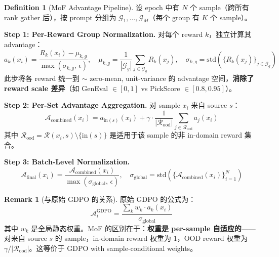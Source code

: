 \documentclass[11pt,a4paper]{article}
\theoremstyle{definition}
\newtheorem{definition}{Definition}
\newtheorem{remark}{Remark}
\begin{document}
\begin{definition}[MoF Advantage Pipeline]
\label{def:advantage}
设 epoch 中有 $N$ 个 sample（跨所有 rank gather 后），按 prompt 分组为 $\mathcal{G}_1, \ldots, \mathcal{G}_M$（每个 group 有 $K$ 个 sample）。

\textbf{Step 1: Per-Reward Group Normalization.} 对每个 reward $k$，独立计算其 advantage：
\begin{equation}
a_k(x_i) = \frac{R_k(x_i) - \mu_{k,g}}{\max(\sigma_{k,g},\, \epsilon)}, \quad
\mu_{k,g} = \frac{1}{|\mathcal{G}_g|}\sum_{j \in \mathcal{G}_g} R_k(x_j), \quad
\sigma_{k,g} = \mathrm{std}(\{R_k(x_j)\}_{j \in \mathcal{G}_g})
\label{eq:per_reward_norm}
\end{equation}
此步将各 reward 统一到 $\sim$ zero-mean, unit-variance 的 advantage 空间，\textbf{消除了 reward scale 差异}（如 GenEval $\in [0,1]$ vs PickScore $\in [0.8, 0.95]$）。

\textbf{Step 2: Per-Set Advantage Aggregation.} 对 sample $x_i$ 来自 source $s$：
\begin{equation}
\boxed{
\mathcal{A}_{\mathrm{combined}}(x_i) = a_{\mathrm{in}(s)}(x_i) + \gamma \cdot \frac{1}{|\mathcal{R}_{\mathrm{ood}}|}\sum_{j \in \mathcal{R}_{\mathrm{ood}}} a_j(x_i)
}
\label{eq:advantage_aggregation}
\end{equation}
其中 $\mathcal{R}_{\mathrm{ood}} = \mathcal{R}(x_i, s) \setminus \{\mathrm{in}(s)\}$ 是适用于该 sample 的非 in-domain reward 集合。

\textbf{Step 3: Batch-Level Normalization.}
\begin{equation}
\mathcal{A}_{\mathrm{final}}(x_i) = \frac{\mathcal{A}_{\mathrm{combined}}(x_i)}{\max(\sigma_{\mathrm{global}},\, \epsilon)}, \quad
\sigma_{\mathrm{global}} = \mathrm{std}(\{\mathcal{A}_{\mathrm{combined}}(x_i)\}_{i=1}^N)
\label{eq:final_norm}
\end{equation}
\end{definition}

\begin{remark}[与原始 GDPO 的关系]
原始 GDPO 的公式为：
\begin{equation}
\mathcal{A}^{\mathrm{GDPO}}_i = \frac{\sum_k w_k \cdot a_k(x_i)}{\sigma_{\mathrm{global}}}
\end{equation}
其中 $w_k$ 是全局静态权重。MoF 的区别在于：\textbf{权重是 per-sample 自适应的}——对来自 source $s$ 的 sample，in-domain reward 权重为 $1$，OOD reward 权重为 $\gamma/|\mathcal{R}_{\mathrm{ood}}|$。这等价于 GDPO with sample-conditional weights。
\end{remark}
\end{document}
